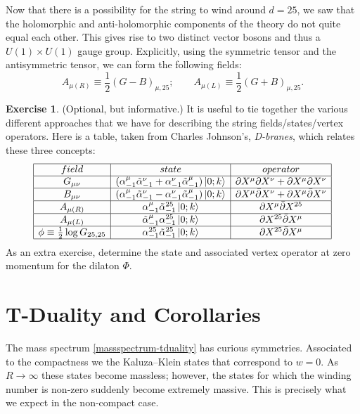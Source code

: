 \documentclass{report}
\theoremstyle{plain}
\theoremstyle{definition}
\newtheorem{exercise}{Exercise}[section]
\theoremstyle{remark}
\newcommand{\FR}[2]{\frac{#1}{#2}}
\newcommand{\di}{\partial}
\begin{document}
Now that there is a possibility for the string to wind around
$d=25$, we saw that the holomorphic and anti-holomorphic components of the
theory do not quite equal each other. This gives rise to two distinct
vector bosons and thus a $U(1)\times U(1)$ gauge group. Explicitly, using
the symmetric tensor and the antisymmetric tensor, we can form the
following fields:
\[ A_{\mu(R)} \equiv \FR{1}{2}(G-B)_{\mu,25};\qquad
A_{\mu(L)} \equiv \FR{1}{2}(G+B)_{\mu,25}.\]
\begin{exercise}(Optional, but informative.) It is useful to tie together
    the various different approaches that we have for describing the
    string fields/states/vertex operators. Here is a table, taken from
    Charles Johnson's, \emph{D-branes}, which relates these three concepts:
    \begin{align*}
    \begin{array}{|c|c|c|}
        \hline
        field & state & operator\\
        \hline
G_{\mu\nu} & (\alpha^\mu_{-1}\tilde\alpha^\nu_{-1} + \alpha^\nu_{-1}\tilde\alpha^\mu_{-1})\ket{0;k} & \di X^\mu\di X^\nu + \di X^\mu\di X^\nu\\
        \hline
B_{\mu\nu} & (\alpha^\mu_{-1}\tilde\alpha^\nu_{-1} - \alpha^\nu_{-1}\tilde\alpha^\mu_{-1})\ket{0;k} & \di X^\mu\bar\di X^\nu + \di X^\mu\bar\di X^\nu\\
        \hline
A_{\mu(R)} & \alpha^{\mu}_{-1}\tilde\alpha^{25}_{-1}\ket{0;k} & \di X^\mu\bar\di X^{25}\\
        \hline
A_{\mu(L)} & \tilde\alpha^{\mu}_{-1}\alpha^{25}_{-1}\ket{0;k} & \di X^{25}\bar\di X^\mu\\
        \hline
\phi \equiv \FR{1}{2}\log G_{25,25} &
\alpha^{25}_{-1}\tilde\alpha^{25}_{-1}\ket{0;k} & \di X^{25}\bar\di
X^\mu\\
    \hline
    \end{array}
    \end{align*}
    As an extra exercise, determine the state and associated vertex
    operator at zero momentum for the dilaton $\Phi$.
\end{exercise}

\section{T-Duality and Corollaries}
The mass spectrum \eqref{massspectrum-tduality} has curious symmetries.
Associated to the compactness we the Kaluza--Klein states that correspond to
$w=0$. As $R\to\infty$ these states become massless; however, the states
for which the winding number is non-zero suddenly become extremely massive.
This is precisely what we expect in the non-compact case.
\end{document}
